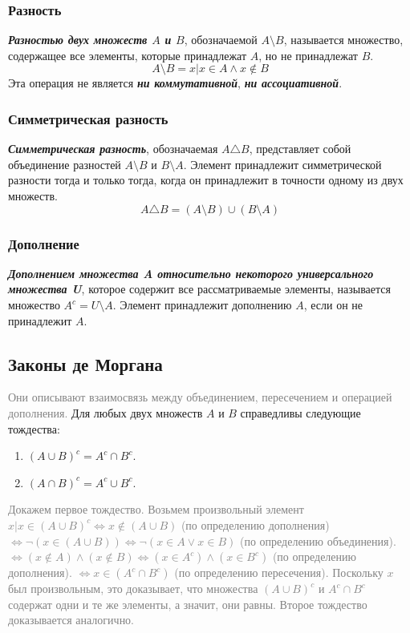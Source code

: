 \documentclass[12pt,letterpaper]{article}
\begin{document}
\subsubsection{Разность}

\textbf{\emph{Разностью двух множеств \(A\) и \(B\)}}, обозначаемой \(A \setminus B\), называется множество, содержащее все элементы, которые принадлежат \(A\), но не принадлежат \(B\).
\[A \setminus B = x \vert x \in A \wedge x \notin B\]
Эта операция не является \textbf{\emph{ни коммутативной}}, \textbf{\emph{ни ассоциативной}}.

\subsubsection{Симметрическая разность}

\textbf{\emph{Симметрическая разность}}, обозначаемая \(A \triangle B\), представляет собой объединение разностей \(A \setminus B\) и \(B \setminus A\). Элемент принадлежит симметрической разности тогда и только тогда, когда он принадлежит в точности одному из двух множеств.
\[A \triangle B = (A \setminus B) \cup (B \setminus A)\]

\subsubsection{Дополнение}

\textbf{\emph{Дополнением множества A относительно некоторого универсального множества U}}, которое содержит все рассматриваемые элементы, называется множество \(A^c = U \setminus A\). Элемент принадлежит дополнению \(A\), если он не принадлежит \(A\).

\subsection{Законы де Моргана}

\textcolor{gray}{Они описывают взаимосвязь между объединением, пересечением и операцией дополнения.}
Для любых двух множеств \(A\) и \(B\) справедливы следующие тождества:
\begin{enumerate}
  \item \((A \cup B) ^ c = A ^ c \cap B ^ c\).
  \item \((A \cap B) ^ c = A ^ c \cup B ^ c\).
\end{enumerate}
\textcolor{gray}{Докажем первое тождество. Возьмем произвольный элемент \(x \vert x \in  (A \cup B) ^ c \Leftrightarrow x \notin (A \cup B)\) (по определению дополнения) \(\Leftrightarrow \neg (x \in (A \cup B)) \Leftrightarrow \neg (x \in A \vee x \in B)\) (по определению объединения). \(\Leftrightarrow (x \notin A) \wedge (x \notin B) \Leftrightarrow (x \in A ^ c) \wedge (x \in B ^ c)\) (по определению дополнения). \(\Leftrightarrow x \in (A ^ c \cap B ^ c)\) (по определению пересечения). Поскольку \(x\) был произвольным, это доказывает, что множества \((A \cup B) ^ c\)  и \(A ^ c \cap B ^ c\)  содержат одни и те же элементы, а значит, они равны.
Второе тождество доказывается аналогично.}
\end{document}
